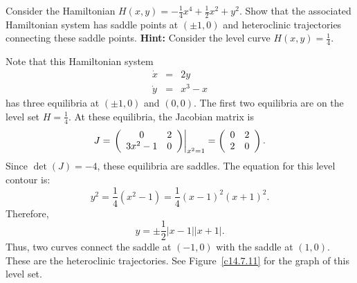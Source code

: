 \documentclass{ximera}
\begin{document}
\begin{exercise} \label{c14.7.11} 
Consider the Hamiltonian  $H(x,y) = -\frac{1}{4}x^4 + \frac{1}{2}x^2 + y^2$.  
Show that the associated Hamiltonian system has saddle points at $(\pm 1,0)$ 
and heteroclinic trajectories connecting these saddle points.  {\bf Hint:} 
Consider the level curve $H(x,y) = \frac{1}{4}$.

\begin{solution}

Note that this Hamiltonian system
\begin{eqnarray*}
\dot{x}& = & 2y\\
\dot{y} &  =&  x^3 -x
\end{eqnarray*}
has three equilibria at $(\pm 1,0)$ and $(0,0)$.  The first two equilibria
are on the level set $H= \frac{1}{4}$.  At these equilibria, the Jacobian
matrix is
\[
J = \left.\left(\begin{array}{cc} 0 & 2\\ 3x^2-1 &0\end{array}\right)\right|_{x^2=1} = 
\left(\begin{array}{cc} 0 & 2\\ 2 &0\end{array}\right).
\]
Since $\det(J)=-4$, these equilibria are saddles.
The equation for this level contour is: 
\[
y^2=\frac{1}{4}(x^2-1)=\frac{1}{4}(x-1)^2(x+1)^2.
\]
Therefore,
\[
y = \pm\frac{1}{2}|x-1||x+1|.
\]
Thus, two curves connect the saddle at $(-1,0)$ with the saddle at $(1,0)$.
These are the heteroclinic trajectories. See
Figure~\ref{c14.7.11} for the graph of this level set.

\begin{figure}[htb]
     \centerline{%
      }
\end{figure} 
 

\end{solution}
\end{exercise}






 
\end{document}
